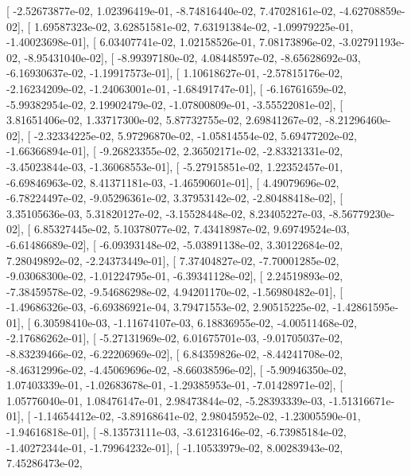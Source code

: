 \documentclass{article}
\begin{document}
       [ -2.52673877e-02,   1.02396419e-01,  -8.74816440e-02,
          7.47028161e-02,  -4.62708859e-02],
       [  1.69587323e-02,   3.62851581e-02,   7.63191384e-02,
         -1.09979225e-01,  -1.40023698e-01],
       [  6.03407741e-02,   1.02158526e-01,   7.08173896e-02,
         -3.02791193e-02,  -8.95431040e-02],
       [ -8.99397180e-02,   4.08448597e-02,  -8.65628692e-03,
         -6.16930637e-02,  -1.19917573e-01],
       [  1.10618627e-01,  -2.57815176e-02,  -2.16234209e-02,
         -1.24063001e-01,  -1.68491747e-01],
       [ -6.16761659e-02,  -5.99382954e-02,   2.19902479e-02,
         -1.07800809e-01,  -3.55522081e-02],
       [  3.81651406e-02,   1.33717300e-02,   5.87732755e-02,
          2.69841267e-02,  -8.21296460e-02],
       [ -2.32334225e-02,   5.97296870e-02,  -1.05814554e-02,
          5.69477202e-02,  -1.66366894e-01],
       [ -9.26823355e-02,   2.36502171e-02,  -2.83321331e-02,
         -3.45023844e-03,  -1.36068553e-01],
       [ -5.27915851e-02,   1.22352457e-01,  -6.69846963e-02,
          8.41371181e-03,  -1.46590601e-01],
       [  4.49079696e-02,  -6.78224497e-02,  -9.05296361e-02,
          3.37953142e-02,  -2.80488418e-02],
       [  3.35105636e-03,   5.31820127e-02,  -3.15528448e-02,
          8.23405227e-03,  -8.56779230e-02],
       [  6.85327445e-02,   5.10378077e-02,   7.43418987e-02,
          9.69749524e-03,  -6.61486689e-02],
       [ -6.09393148e-02,  -5.03891138e-02,   3.30122684e-02,
          7.28049892e-02,  -2.24373449e-01],
       [  7.37404827e-02,  -7.70001285e-02,  -9.03068300e-02,
         -1.01224795e-01,  -6.39341128e-02],
       [  2.24519893e-02,  -7.38459578e-02,  -9.54686298e-02,
          4.94201170e-02,  -1.56980482e-01],
       [ -1.49686326e-03,  -6.69386921e-04,   3.79471553e-02,
          2.90515225e-02,  -1.42861595e-01],
       [  6.30598410e-03,  -1.11674107e-03,   6.18836955e-02,
         -4.00511468e-02,  -2.17686262e-01],
       [ -5.27131969e-02,   6.01675701e-03,  -9.01705037e-02,
         -8.83239466e-02,  -6.22206969e-02],
       [  6.84359826e-02,  -8.44241708e-02,  -8.46312996e-02,
         -4.45069696e-02,  -8.66038596e-02],
       [ -5.90946350e-02,   1.07403339e-01,  -1.02683678e-01,
         -1.29385953e-01,  -7.01428971e-02],
       [  1.05776040e-01,   1.08476147e-01,   2.98473844e-02,
         -5.28393339e-03,  -1.51316671e-01],
       [ -1.14654412e-02,  -3.89168641e-02,   2.98045952e-02,
         -1.23005590e-01,  -1.94616818e-01],
       [ -8.13573111e-03,  -3.61231646e-02,  -6.73985184e-02,
         -1.40272344e-01,  -1.79964232e-01],
       [ -1.10533979e-02,   8.00283943e-02,   7.45286473e-02,
\end{document}
